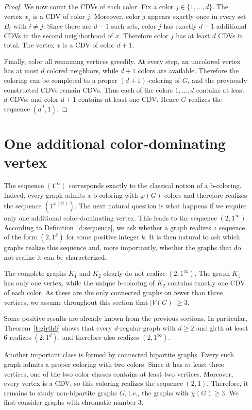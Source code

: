 \documentclass{article}
\theoremstyle{definition}
\begin{document}
\begin{proof}
We now count the CDVs of each color. Fix a color $j\in\{1,\ldots,d\}$. The vertex $x_j$ is a CDV of color $j$. Moreover, color $j$ appears exactly once in every set $B_i$ with $i\neq j$. Since there are $d-1$ such sets, color $j$ has exactly $d-1$ additional CDVs in the second neighborhood of $x$. Therefore color $j$ has at least $d$ CDVs in total. The vertex $x$ is a CDV of color $d+1$.

Finally, color all remaining vertices greedily. At every step, an uncolored vertex has at most $d$ colored neighbors, while $d+1$ colors are available. Therefore the coloring can be completed to a proper $(d+1)$-coloring of $G$, and the previously constructed CDVs remain CDVs. Thus each of the colors $1,\ldots,d$ contains at least $d$ CDVs, and color $d+1$ contains at least one CDV. Hence $G$ realizes the sequence $(d^d,1)$.
\end{proof}

\section{One additional color-dominating vertex}\label{s:oneAdd}

The sequence $(1^\infty)$ corresponds exactly to the classical notion of a b-coloring. Indeed, every graph admits a b-coloring with $\varphi(G)$ colors and therefore realizes the sequence $(1^{\varphi(G)})$. The next natural question is what happens if we require only one additional color-dominating vertex. This leads to the sequence $(2,1^\infty)$. According to Definition~\ref{d:sequence}, we ask whether a graph realizes a sequence of the form $(2,1^k)$ for some positive integer $k$. It is then natural to ask which graphs realize this sequence and, more importantly, whether the graphs that do not realize it can be characterized.

The complete graphs $K_1$ and $K_2$ clearly do not realize $(2,1^\infty)$. The graph $K_1$ has only one vertex, while the unique b-coloring of $K_2$ contains exactly one CDV of each color. As these are the only connected graphs on fewer than three vertices, we assume throughout this section that $|V(G)|\ge 3$.

Some positive results are already known from the previous sections. In particular, Theorem~\ref{t:girth6} shows that every $d$-regular graph with $d\ge 2$ and girth at least $6$ realizes $(2,1^d)$, and therefore also realizes $(2,1^\infty)$.

Another important class is formed by connected bipartite graphs. Every such graph admits a proper coloring with two colors. Since it has at least three vertices, one of the two color classes contains at least two vertices. Moreover, every vertex is a CDV, so this coloring realizes the sequence $(2,1)$. Therefore, it remains to study non-bipartite graphs $G$, i.e., the graphs with $\chi(G)\geq3$. We first consider graphs with chromatic number $3$.
\end{document}
